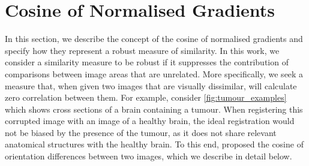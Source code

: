 \section{Cosine of Normalised Gradients}\label{sec:singl_img_cosine_normalised_gradients}
In this section, we describe the concept of the cosine of normalised gradients
and specify how they represent a robust measure of similarity. In this work, we
consider a similarity measure to be robust if it suppresses the contribution of
comparisons between image areas that are unrelated. More specifically, we seek a
measure that, when given two images that are visually dissimilar, will calculate
zero correlation between them. For example, consider
\cref{fig:tumour_examples} which shows cross sections of a brain containing a 
tumour. When registering this corrupted image with an image of a healthy brain, 
the ideal registration would not be biased by the presence of the tumour, as it 
does not share relevant anatomical structures with the healthy brain.
To this end, \citet{RefWorks:68,RefWorks:6} proposed the
cosine of orientation differences between two images, which we describe in
detail below.
